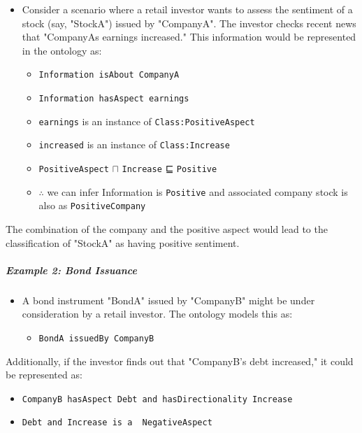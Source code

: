 \documentclass[
]{article}
\begin{document}
\begin{itemize}
\item
  Consider a scenario where a retail investor wants to assess the
  sentiment of a stock (say, "StockA") issued by "CompanyA". The
  investor checks recent news that "CompanyA\textquotesingle s earnings
  increased." This information would be represented in the ontology as:

  \begin{itemize}
  \item
    \texttt{Information\ isAbout\ CompanyA}
  \item
    \texttt{Information\ hasAspect\ earnings}
  \item
    \texttt{earnings} is an instance of \texttt{Class:PositiveAspect}
  \item
    \texttt{increased} is an instance of \texttt{Class:Increase}
  \item
    \texttt{PositiveAspect} \(\sqcap\) \texttt{Increase} ⊑
    \texttt{Positive}
  \item
    \(\therefore\) we can infer Information is \texttt{Positive} and
    associated company stock is also as \texttt{PositiveCompany}
  \end{itemize}
\end{itemize}

The combination of the company and the positive aspect would lead to the
classification of "StockA" as having positive sentiment.

\subparagraph{Example 2: Bond Issuance}\label{example-2-bond-issuance}

\begin{itemize}
\item
  A bond instrument "BondA" issued by "CompanyB" might be under
  consideration by a retail investor. The ontology models this as:

  \begin{itemize}
  \item
    \texttt{BondA\ issuedBy\ CompanyB}
  \end{itemize}
\end{itemize}

Additionally, if the investor finds out that "CompanyB's debt
increased," it could be represented as:

\begin{itemize}
\item
  \texttt{CompanyB\ hasAspect\ Debt\ and\ hasDirectionality\ Increase}
\item
  \texttt{Debt\ and\ Increase\ is\ a\ \ NegativeAspect}
\end{itemize}
\end{document}
